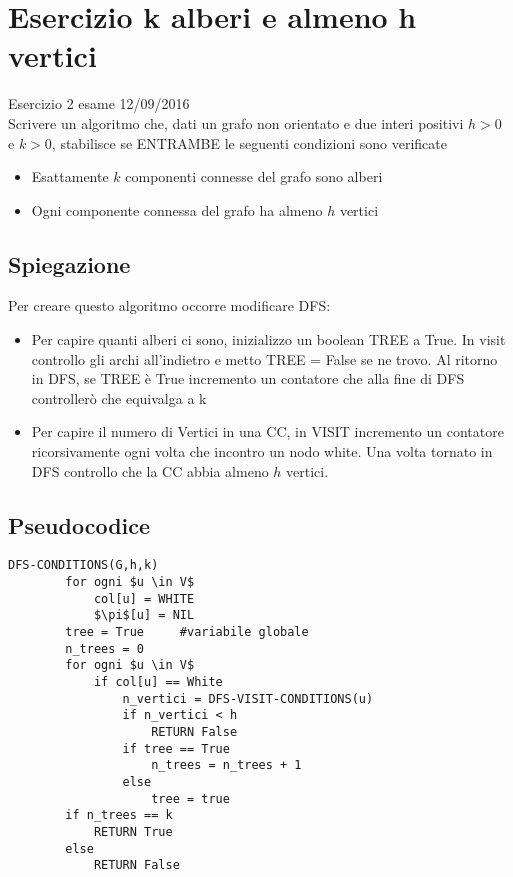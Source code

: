 \documentclass[12pt, a4paper, openany]{book}
\begin{document}
	\section{Esercizio k alberi e almeno h vertici} Esercizio 2 esame 12/09/2016\\
	Scrivere un algoritmo che, dati un grafo non orientato e due interi positivi $h>0$ e $k>0$, stabilisce se ENTRAMBE le seguenti condizioni sono verificate
	\begin{itemize}
		\item Esattamente $k$ componenti connesse del grafo sono alberi
		\item Ogni componente connessa del grafo ha almeno $h$ vertici
	\end{itemize}

	\subsection*{Spiegazione}
	Per creare questo algoritmo occorre modificare DFS:
	\begin{itemize}
		\item Per capire quanti alberi ci sono, inizializzo un boolean TREE a True. In visit controllo gli archi all'indietro e metto TREE = False se ne trovo. Al ritorno in DFS, se TREE è True incremento un contatore che alla fine di DFS controllerò che equivalga a k
		\item Per capire il numero di Vertici in una CC, in VISIT incremento un contatore ricorsivamente ogni volta che incontro un nodo white. Una volta tornato in DFS controllo che la CC abbia almeno $h$ vertici.
	\end{itemize}

	\subsection*{Pseudocodice}
	\begin{lstlisting}[mathescape=true]
    DFS-CONDITIONS(G,h,k)
        for ogni $u \in V$
            col[u] = WHITE
            $\pi$[u] = NIL
        tree = True     #variabile globale
        n_trees = 0
        for ogni $u \in V$
            if col[u] == White
                n_vertici = DFS-VISIT-CONDITIONS(u)
                if n_vertici < h
                    RETURN False
                if tree == True
                    n_trees = n_trees + 1
                else
                    tree = true
        if n_trees == k
            RETURN True
        else
            RETURN False
    \end{lstlisting}
\end{document}
